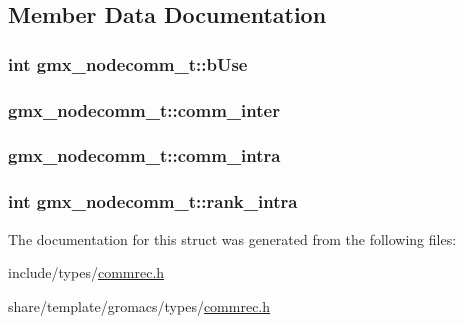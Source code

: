 \subsection{\-Member \-Data \-Documentation}
\hypertarget{structgmx__nodecomm__t_a904fb41e4b451fa76fa0ae65ec53eb85}{
\subsubsection[{b\-Use}]{\setlength{\rightskip}{0pt plus 5cm}int {\bf gmx\-\_\-nodecomm\-\_\-t\-::b\-Use}}}\label{structgmx__nodecomm__t_a904fb41e4b451fa76fa0ae65ec53eb85}
\hypertarget{structgmx__nodecomm__t_a4e6e810d89391b34f11873b2dbb7c33d}{
\subsubsection[{comm\-\_\-inter}]{ {\bf gmx\-\_\-nodecomm\-\_\-t\-::comm\-\_\-inter}}}\label{structgmx__nodecomm__t_a4e6e810d89391b34f11873b2dbb7c33d}
\hypertarget{structgmx__nodecomm__t_afae7484f448c0085bf165a1027872a22}{
\subsubsection[{comm\-\_\-intra}]{ {\bf gmx\-\_\-nodecomm\-\_\-t\-::comm\-\_\-intra}}}\label{structgmx__nodecomm__t_afae7484f448c0085bf165a1027872a22}
\hypertarget{structgmx__nodecomm__t_a63850c544dc8d9faec882058957acb1a}{
\subsubsection[{rank\-\_\-intra}]{\setlength{\rightskip}{0pt plus 5cm}int {\bf gmx\-\_\-nodecomm\-\_\-t\-::rank\-\_\-intra}}}\label{structgmx__nodecomm__t_a63850c544dc8d9faec882058957acb1a}


\-The documentation for this struct was generated from the following files\-:\begin{DoxyCompactItemize}
\item 
include/types/\hyperlink{include_2types_2commrec_8h}{commrec.\-h}\item 
share/template/gromacs/types/\hyperlink{share_2template_2gromacs_2types_2commrec_8h}{commrec.\-h}\end{DoxyCompactItemize}
